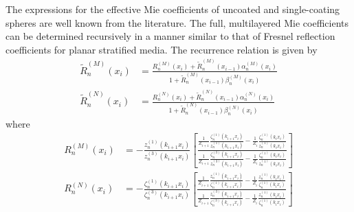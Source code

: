 %
The expressions for the effective Mie coefficients of uncoated and single-coating spheres are well known from the literature.\cite{Mie1976, Kaiser1993, Bohren2004, Zhou2006, Zheng2015} The full, multilayered Mie coefficients can be determined recursively in a manner similar to that of Fresnel reflection coefficients for planar stratified media.\cite{Narayanaswamy2013b} The recurrence relation is given by
%
\begin{subequations} \label{eq:MultilayeredMie}
\begin{align}
\widetilde{R}_{n}^{(M)}(x_{i}) &= \frac{ R_{n}^{(M)}(x_{i}) + \widetilde{R}_{n}^{(M)}(x_{i-1}) \alpha_{n}^{(M)}(x_{i}) }{ 1 + \widetilde{R}_{n}^{(M)}(x_{i-1}) \beta_{n}^{(M)}(x_{i}) }
\\
\widetilde{R}_{n}^{(N)}(x_{i}) &= \frac{ R_{n}^{(N)}(x_{i}) + \widetilde{R}_{n}^{(N)}(x_{i-1}) \alpha_{n}^{(N)}(x_{i}) }{ 1 + \widetilde{R}_{n}^{(N)}(x_{i-1}) \beta_{n}^{(N)}(x_{i}) }
\end{align}
\end{subequations}
%
where
%
\begin{subequations}\label{eq:Mie_definition1}
\begin{align}
R_{n}^{(M)}(x_{i})
&= - \frac{z_{n}^{(1)}(k_{i+1} x_{i})}{z_{n}^{(3)}(k_{i+1} x_{i})}
\left[ \frac{ \frac{1}{Z_{i+1}} \frac{\zeta_{n}^{(1)}(k_{i+1} x_{i})}{z_{n}^{(1)}(k_{i+1} x_{i})} - \frac{1}{Z_{i}} \frac{\zeta_{n}^{(1)}(k_{i} x_{i})}{z_{n}^{(1)}(k_{i} x_{i})} }{ \frac{1}{Z_{i+1}} \frac{\zeta_{n}^{(3)}(k_{i+1} x_{i})}{z_{n}^{(3)}(k_{i+1} x_{i})} - \frac{1}{Z_{i}} \frac{\zeta_{n}^{(1)}(k_{i} x_{i})}{z_{n}^{(1)}(k_{i} x_{i})} } \right]
\\
R_{n}^{(N)}(x_{i})
&= - \frac{\zeta_{n}^{(1)}(k_{i+1} x_{i})}{\zeta_{n}^{(3)}(k_{i+1} x_{i})}
\left[ \frac{ \frac{1}{Z_{i+1}} \frac{z_{n}^{(1)}(k_{i+1} x_{i})}{\zeta_{n}^{(1)}(k_{i+1} x_{i})} - \frac{1}{Z_{i}} \frac{z_{n}^{(1)}(k_{i} x_{i})}{\zeta_{n}^{(1)}(k_{i} x_{i})} }{ \frac{1}{Z_{i+1}} \frac{z_{n}^{(3)}(k_{i+1} x_{i})}{\zeta_{n}^{(3)}(k_{i+1} x_{i})} - \frac{1}{Z_{i}} \frac{z_{n}^{(1)}(k_{i} x_{i})}{\zeta_{n}^{(1)}(k_{i} x_{i})} } \right]
\end{align}
\end{subequations}
%

